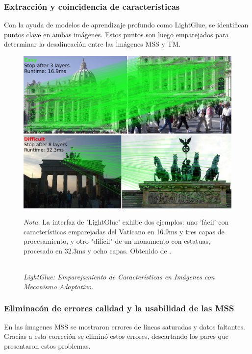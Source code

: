             \subsubsection{Extracción y coincidencia de características}
                Con la ayuda de modelos de aprendizaje profundo como LightGlue, se identifican puntos clave en ambas imágenes. Estos puntos son luego emparejados para determinar la desalineación entre las imágenes MSS y TM.
                
                \begin{figure}[H] 
                    \caption{\doublespacing \\ \textit{LightGlue: Emparejamiento de Características en Imágenes con Mecanismo Adaptativo.}} 
                    \centering
                    \includegraphics[width=1\linewidth]{2_CAPITULO0/IMG/cvg.png}
                    \begin{justify}
                        \textit{Nota.} La interfaz de 'LightGlue' exhibe dos ejemplos: uno 'fácil' con características emparejadas del Vaticano en 16.9ms y tres capas de procesamiento, y otro "difícil" de un monumento con estatuas, procesado en 32.3ms y ocho capas. Obtenido de \textcite{LightGlue2023}.
                    \end{justify}                    
                    \label{cvg}
                \end{figure}
                
            \subsubsection{Eliminacón de errores calidad y la usabilidad de las MSS}
                En las ímagenes MSS se mostraron errores de líneas saturadas y datos faltantes. Gracias a esta correción se eliminó estos errores, descartando los pares que presentaron estos problemas.

